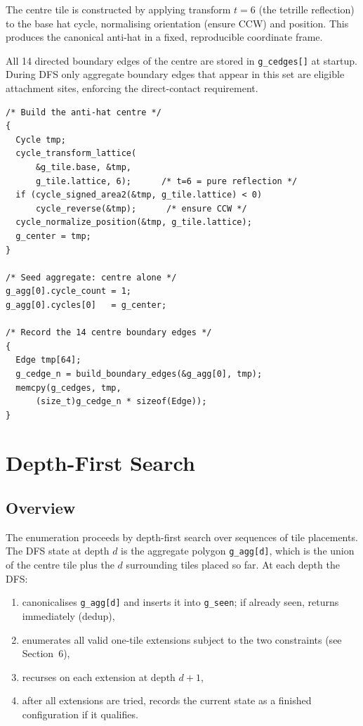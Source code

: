 \documentclass[10pt,a4paper]{article}
\let\polysection\section
\renewcommand\section{\needspace{0.16\textheight}\polysection}
\let\polysubsection\subsection
\renewcommand\subsection{\needspace{0.12\textheight}\polysubsection}
\newcommand{\code}[1]{\texttt{\small #1}}
\begin{document}
\begin{tcolorbox}[dualbox, title={Anti-Hat Centre and Edge Extraction}]
  The centre tile is constructed by applying transform $t = 6$ (the
  tetrille reflection) to the base hat cycle, normalising orientation
  (ensure CCW) and position.  This produces the canonical anti-hat
  in a fixed, reproducible coordinate frame.

  All 14 directed boundary edges of the centre are stored in
  \code{g\_cedges[]} at startup.  During DFS only aggregate boundary
  edges that appear in this set are eligible attachment sites,
  enforcing the direct-contact requirement.
\tcblower
\begin{verbatim}
/* Build the anti-hat centre */
{
  Cycle tmp;
  cycle_transform_lattice(
      &g_tile.base, &tmp,
      g_tile.lattice, 6);      /* t=6 = pure reflection */
  if (cycle_signed_area2(&tmp, g_tile.lattice) < 0)
      cycle_reverse(&tmp);      /* ensure CCW */
  cycle_normalize_position(&tmp, g_tile.lattice);
  g_center = tmp;
}

/* Seed aggregate: centre alone */
g_agg[0].cycle_count = 1;
g_agg[0].cycles[0]   = g_center;

/* Record the 14 centre boundary edges */
{
  Edge tmp[64];
  g_cedge_n = build_boundary_edges(&g_agg[0], tmp);
  memcpy(g_cedges, tmp,
      (size_t)g_cedge_n * sizeof(Edge));
}
\end{verbatim}
\end{tcolorbox}

\section{Depth-First Search}

\subsection{Overview}

The enumeration proceeds by depth-first search over sequences of tile
placements.  The DFS state at depth $d$ is the aggregate polygon
\code{g\_agg[d]}, which is the union of the centre tile plus the $d$
surrounding tiles placed so far.  At each depth the DFS:

\begin{enumerate}
  \item canonicalises \code{g\_agg[d]} and inserts it into
    \code{g\_seen}; if already seen, returns immediately (dedup),
  \item enumerates all valid one-tile extensions subject to the two
    constraints (see Section~6),
  \item recurses on each extension at depth $d + 1$,
  \item after all extensions are tried, records the current state
    as a finished configuration if it qualifies.
\end{enumerate}
\end{document}
